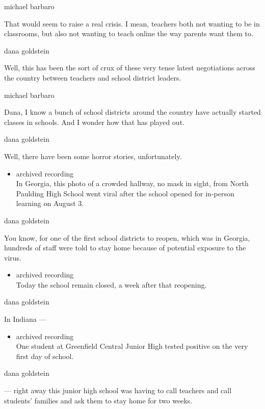 michael barbaro

That would seem to raise a real crisis. I mean, teachers both not
wanting to be in classrooms, but also not wanting to teach online the
way parents want them to.

dana goldstein

Well, this has been the sort of crux of these very tense latest
negotiations across the country between teachers and school district
leaders.

michael barbaro

Dana, I know a bunch of school districts around the country have
actually started classes in schools. And I wonder how that has played
out.

dana goldstein

Well, there have been some horror stories, unfortunately.

\begin{itemize}
\tightlist
\item
  archived recording\\
  In Georgia, this photo of a crowded hallway, no mask in sight, from
  North Paulding High School went viral after the school opened for
  in-person learning on August 3.
\end{itemize}

dana goldstein

You know, for one of the first school districts to reopen, which was in
Georgia, hundreds of staff were told to stay home because of potential
exposure to the virus.

\begin{itemize}
\tightlist
\item
  archived recording\\
  Today the school remain closed, a week after that reopening.
\end{itemize}

dana goldstein

In Indiana ---

\begin{itemize}
\tightlist
\item
  archived recording\\
  One student at Greenfield Central Junior High tested positive on the
  very first day of school.
\end{itemize}

dana goldstein

--- right away this junior high school was having to call teachers and
call students' families and ask them to stay home for two weeks.


